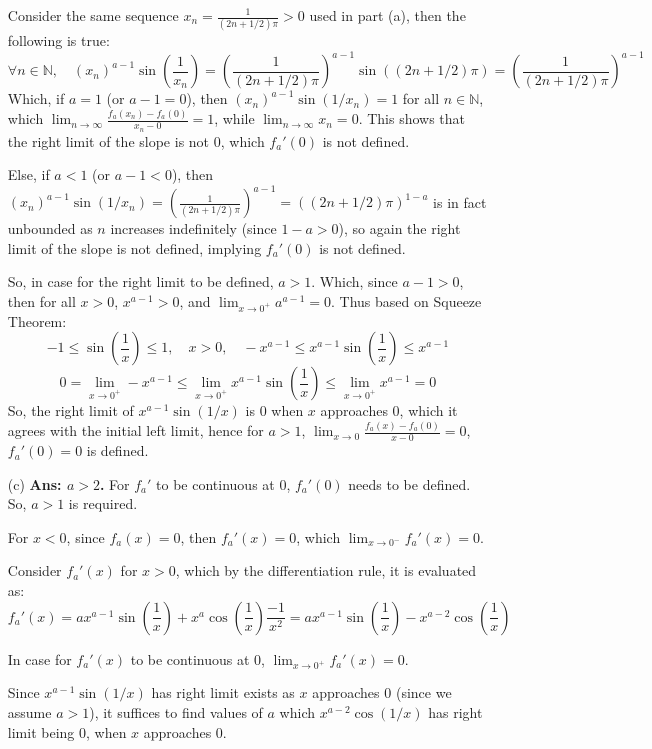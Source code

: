 \documentclass{article}
\begin{document}
\begin{itemize}
    Consider the same sequence $x_n = \frac{1}{(2n+1/2)\pi}>0$ used in part (a), then the following is true:
    $$\forall n\in\mathbb{N},\quad (x_n)^{a-1}\sin\left(\frac{1}{x_n}\right) = \left(\frac{1}{(2n+1/2)\pi}\right)^{a-1}\sin((2n+1/2)\pi) = \left(\frac{1}{(2n+1/2)\pi}\right)^{a-1}$$
    Which, if $a=1$ (or $a-1=0$), then $(x_n)^{a-1}\sin(1/x_n) = 1$ for all $n\in\mathbb{N}$, which $\lim_{n\rightarrow\infty}\frac{f_a(x_n)-f_a(0)}{x_n-0} = 1$, while $\lim_{n\rightarrow\infty}x_n=0$. 
    This shows that the right limit of the slope is not $0$, which $f_a'(0)$ is not defined.

    Else, if $a<1$ (or $a-1<0$), then $(x_n)^{a-1}\sin(1/x_n) = \left(\frac{1}{(2n+1/2)\pi}\right)^{a-1}= ((2n+1/2)\pi)^{1-a}$ is in fact unbounded as $n$ increases indefinitely (since $1-a>0$), 
    so again the right limit of the slope is not defined, implying $f_a'(0)$ is not defined.

    \hfill

    So, in case for the right limit to be defined, $a>1$. Which, since $a-1>0$, then for all $x>0$, $x^{a-1}>0$, and $\lim_{x\rightarrow 0^+}a^{a-1}=0$. Thus based on Squeeze Theorem:
    $$-1\leq \sin\left(\frac{1}{x}\right)\leq 1,\quad x>0,\quad -x^{a-1}\leq x^{a-1}\sin\left(\frac{1}{x}\right)\leq x^{a-1}$$
    $$0=\lim_{x\rightarrow0^+}-x^{a-1} \leq \lim_{x\rightarrow0^+}x^{a-1}\sin\left(\frac{1}{x}\right) \leq \lim_{x\rightarrow0^+}x^{a-1}=0$$
    So, the right limit of $x^{a-1}\sin(1/x)$ is $0$ when $x$ approaches $0$, which it agrees with the initial left limit,
    hence for $a>1$, $\lim_{x\rightarrow 0}\frac{f_a(x)-f_a(0)}{x-0} = 0$, $f_a'(0)=0$ is defined.

    \hfill

    \item[(c)] \textbf{Ans: $a>2$.} For $f_a'$ to be continuous at $0$, $f_a'(0)$ needs to be defined. So, $a>1$ is required.
    
    For $x<0$, since $f_a(x)=0$, then $f_a'(x)=0$, which $\lim_{x\rightarrow 0^-}f_a'(x)=0$.
    
    Consider $f_a'(x)$ for $x> 0$, which by the differentiation rule, it is evaluated as:
    $$f_a'(x)=ax^{a-1}\sin\left(\frac{1}{x}\right) + x^a\cos\left(\frac{1}{x}\right)\frac{-1}{x^2} = ax^{a-1}\sin\left(\frac{1}{x}\right) - x^{a-2}\cos\left(\frac{1}{x}\right)$$
    
    In case for $f_a'(x)$ to be continuous at $0$, $\lim_{x\rightarrow 0^+}f_a'(x) = 0$.
    
    Since $x^{a-1}\sin(1/x)$ has right limit exists as $x$ approaches $0$ (since we assume $a>1$), it suffices to find values of $a$ which $x^{a-2}\cos(1/x)$ has right limit being $0$, when $x$ approaches $0$.


\end{itemize}
\end{document}
